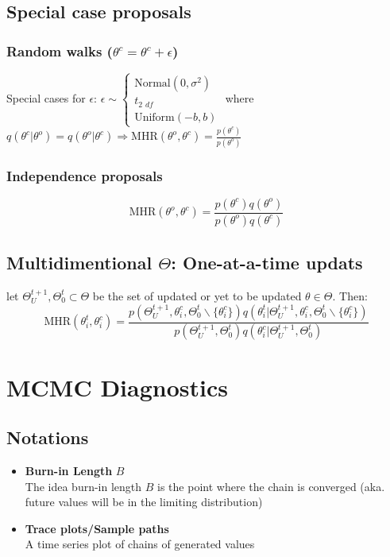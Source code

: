 \documentclass[12pt]{article}
\theoremstyle{definition}
\begin{document}
    \subsection*{Special case proposals}
        \subsubsection*{Random walks ($\theta^c = \theta^c + \epsilon$)}
        Special cases for $\epsilon$: $\epsilon \sim \begin{cases}
            \text{Normal}(0,\sigma^2)\\
            t_2\ _{df}\\
            \text{Uniform}(-b,b)
        \end{cases}$ where $q(\theta^c|\theta^o) = q(\theta^o|\theta^c) \Rightarrow \text{MHR}(\theta^o, \theta^c) = \frac{p(\theta^c)}{p(\theta^o)}$
        \subsubsection*{Independence proposals}
        $$\text{MHR}(\theta^o, \theta^c) = \frac{p(\theta^c)q(\theta^o)}{p(\theta^o)q(\theta^c)}$$
    \subsection*{Multidimentional $\Theta$: One-at-a-time updats}
    let $\Theta_U^{t+1},\Theta_0^{t} \subset \Theta$ be the set of updated or yet to be updated $\theta \in \Theta$. Then:
    $$\text{MHR}(\theta_i^t, \theta_i^c) = 
    \frac{p(\Theta_U^{t+1},\theta_i^c,\Theta_0^{t}\backslash \{\theta_i^c\}) q(\theta_i^t|\Theta_U^{t+1},\theta_i^c,\Theta_0^{t}\backslash \{\theta_i^c\})}
    {p(\Theta_U^{t+1},\Theta_0^{t}) q(\theta_i^c|\Theta_U^{t+1},\Theta_0^{t})}$$

\newpage
\section{MCMC Diagnostics}
    \subsection*{Notations}
        \begin{itemize}
            \item \textbf{Burn-in Length} $B$\\ The idea burn-in length $B$ is the point where the chain is converged (aka. future values will be in the limiting distribution)
            \item \textbf{Trace plots/Sample paths}\\ A time series plot of chains of generated values
        \end{itemize}
\end{document}
